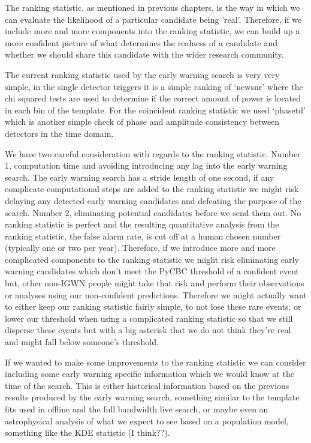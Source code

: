 The ranking statistic, as mentioned in previous chapters, is the way in which we can evaluate the likelihood of a particular candidate being 'real'. Therefore, if we include more and more components into the ranking statistic, we can build up a more confident picture of what determines the realness of a candidate and whether we should share this candidate with the wider research community.

The current ranking statistic used by the early warning search is very very simple, in the single detector triggers it is a simple ranking of `newsnr' where the chi squared tests are used to determine if the correct amount of power is located in each bin of the template. For the coincident ranking statistic we used `phasetd' which is another simple check of phase and amplitude consistency between detectors in the time domain.

We have two careful consideration with regards to the ranking statistic. Number 1, computation time and avoiding introducing any lag into the early warning search. The early warning search has a stride length of one second, if any complicate computational steps are added to the ranking statistic we might risk delaying any detected early warning candidates and defeating the purpose of the search. Number 2, eliminating potential candidates before we send them out. No ranking statistic is perfect and the resulting quantitative analysis from the ranking statistic, the false alarm rate, is cut off at a human chosen number (typically one or two per year). Therefore, if we introduce more and more complicated components to the ranking statistic we might risk eliminating early warning candidates which don't meet the PyCBC threshold of a confident event but, other non-IGWN people might take that risk and perform their observations or analyses using our non-confident predictions. Therefore we might actually want to either keep our ranking statistic fairly simple, to not lose these rare events, or lower our threshold when using a complicated ranking statistic so that we still disperse these events but with a big asterisk that we do not think they're real and might fall below someone's threshold.

If we wanted to make some improvements to the ranking statistic we can consider including some early warning specific information which we would know at the time of the search. This is either historical information based on the previous results produced by the early warning search, something similar to the template fits used in offline and the full bandwidth live search, or maybe even an astrophysical analysis of what we expect to see based on a population model, something like the KDE statistic (I think??).

